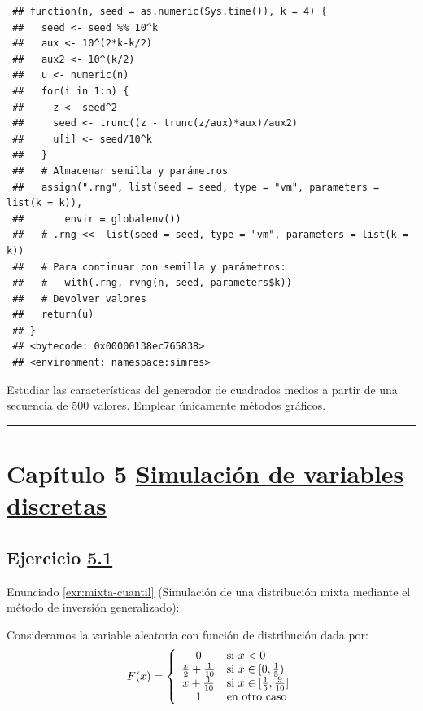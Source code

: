 \documentclass[
]{book}
\theoremstyle{break}
\theoremstyle{nonumberplain}
\begin{document}
\begin{verbatim}
 ## function(n, seed = as.numeric(Sys.time()), k = 4) {
 ##   seed <- seed %% 10^k
 ##   aux <- 10^(2*k-k/2)
 ##   aux2 <- 10^(k/2)
 ##   u <- numeric(n)
 ##   for(i in 1:n) {
 ##     z <- seed^2
 ##     seed <- trunc((z - trunc(z/aux)*aux)/aux2)
 ##     u[i] <- seed/10^k
 ##   }
 ##   # Almacenar semilla y parámetros
 ##   assign(".rng", list(seed = seed, type = "vm", parameters = list(k = k)),
 ##       envir = globalenv())
 ##   # .rng <<- list(seed = seed, type = "vm", parameters = list(k = k))
 ##   # Para continuar con semilla y parámetros:
 ##   #   with(.rng, rvng(n, seed, parameters$k))
 ##   # Devolver valores
 ##   return(u)
 ## }
 ## <bytecode: 0x00000138ec765838>
 ## <environment: namespace:simres>
\end{verbatim}

Estudiar las características del generador de cuadrados medios a partir de una secuencia de 500 valores.
Emplear únicamente métodos gráficos.

\begin{center}\rule{0.5\linewidth}{0.5pt}\end{center}

\hypertarget{capuxedtulo-5-simulaciuxf3n-de-variables-discretas}{%
\section{\texorpdfstring{Capítulo 5 \href{discretas.html}{Simulación de variables discretas}}{Capítulo 5 Simulación de variables discretas}}\label{capuxedtulo-5-simulaciuxf3n-de-variables-discretas}}

\hypertarget{sol-mixta-cuantil}{%
\subsection{\texorpdfstring{Ejercicio \href{ejercicios-discretas.html\#exr:mixta-cuantil}{5.1}}{Ejercicio 5.1}}\label{sol-mixta-cuantil}}

Enunciado \ref{exr:mixta-cuantil} (Simulación de una distribución mixta mediante el método de inversión generalizado):

Consideramos la variable aleatoria con función de distribución dada por:
\[F(x)=\left\{
\begin{array}
[c]{cl}0 & \mbox{si $x<0$}\\
\frac{x}{2}+\frac{1}{10} & \mbox{si $x\in[0,\frac{1}{5})$}\\
x+\frac{1}{10} & \mbox{si $x\in[\frac{1}{5},\frac{9}{10}]$}\\
1 & \mbox{en otro caso}
\end{array}
\right.\]
\end{document}
